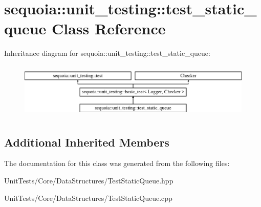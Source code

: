 \hypertarget{classsequoia_1_1unit__testing_1_1test__static__queue}{}\section{sequoia\+::unit\+\_\+testing\+::test\+\_\+static\+\_\+queue Class Reference}
\label{classsequoia_1_1unit__testing_1_1test__static__queue}
Inheritance diagram for sequoia\+::unit\+\_\+testing\+::test\+\_\+static\+\_\+queue\+:\begin{figure}[H]
\begin{center}
\leavevmode
\includegraphics[height=2.666667cm]{classsequoia_1_1unit__testing_1_1test__static__queue}
\end{center}
\end{figure}
\subsection*{Additional Inherited Members}


The documentation for this class was generated from the following files\+:\begin{DoxyCompactItemize}
\item 
Unit\+Tests/\+Core/\+Data\+Structures/Test\+Static\+Queue.\+hpp\item 
Unit\+Tests/\+Core/\+Data\+Structures/Test\+Static\+Queue.\+cpp\end{DoxyCompactItemize}
